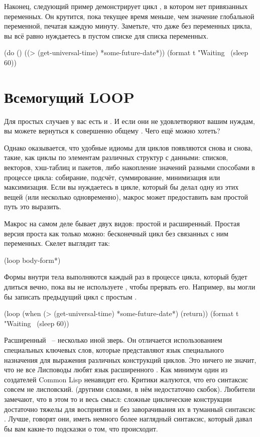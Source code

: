 Наконец, следующий пример демонстрирует цикл , в котором нет привязанных
переменных. Он крутится, пока текущее время меньше, чем значение глобальной переменной,
печатая  каждую минуту. Заметьте, что даже без переменных цикла, вы всё равно
нуждаетесь в пустом списке для списка переменных.

\begin{myverb}
(do ()
    ((> (get-universal-time) *some-future-date*))
  (format t "Waiting~%
  (sleep 60)) 
\end{myverb}

\section{Всемогущий LOOP}

Для простых случаев у вас есть  и . И если они не удовлетворяют
вашим нуждам, вы можете вернуться к совершенно общему . Чего ещё можно хотеть?

Однако оказывается, что удобные идиомы для циклов появляются снова и снова, такие, как
циклы по элементам различных структур с данными: списков, векторов, хэш-таблиц и пакетов,
либо накопление значений разными способами в процессе цикла: собирание, подсчёт,
суммирование, минимизация или максимизация. Если вы нуждаетесь в цикле, который бы делал
одну из этих вещей (или несколько одновременно), макрос  может предоставить вам
простой путь это выразить.

Макрос  на самом деле бывает двух видов: простой и расширенный. Простая версия
проста как только можно: бесконечный цикл без связанных с ним переменных. Скелет выглядит
так:

\begin{myverb}
(loop
  body-form*)
\end{myverb}

Формы внутри тела выполняются каждый раз в процессе цикла, который будет длиться вечно,
пока вы не используете , чтобы прервать его. Например, вы могли бы записать
предыдущий  цикл с простым .

\begin{myverb}
(loop
  (when (> (get-universal-time) *some-future-date*)
    (return))
  (format t "Waiting~%
  (sleep 60))
\end{myverb}

Расширенный ~-- несколько иной зверь. Он отличается использованием специальных
ключевых слов, которые представляют язык специального назначения для выражения различных
конструкций циклов. Это ничего не значит, что не все Лисповоды любят язык расширенного
. Как минимум один из создателей Common Lisp ненавидит его. Критики
 жалуются, что его синтаксис совсем не лисповский. (другими словами, в нём
недостаточно скобок). Любители  замечают, что в этом то и весь смысл: сложные
циклические конструкции достаточно тяжелы для восприятия и без заворачивания их в туманный
синтаксис . Лучше, говорят они, иметь немного более наглядный синтаксис, который
давал бы вам какие-то подсказки о том, что происходит.

